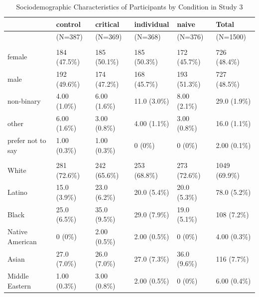 \documentclass[
]{book}
\begin{document}
\begin{table}

\caption{\label{tab:demos-table-s3}Sociodemographic Characteristics of Participants by Condition in Study 3}
\centering
\begin{tabular}[t]{llllll}
\toprule
  & control & critical & individual & naive & Total\\
\midrule
 & (N=387) & (N=369) & (N=368) & (N=376) & (N=1500)\\
\addlinespace[0.3em]
\multicolumn{6}{l}{\textbf{Gender}}\\
\hspace{1em}female & 184 (47.5\%) & 185 (50.1\%) & 185 (50.3\%) & 172 (45.7\%) & 726 (48.4\%)\\
\hspace{1em}male & 192 (49.6\%) & 174 (47.2\%) & 168 (45.7\%) & 193 (51.3\%) & 727 (48.5\%)\\
\hspace{1em}non-binary & 4.00 (1.0\%) & 6.00 (1.6\%) & 11.0 (3.0\%) & 8.00 (2.1\%) & 29.0 (1.9\%)\\
\hspace{1em}other & 6.00 (1.6\%) & 3.00 (0.8\%) & 4.00 (1.1\%) & 3.00 (0.8\%) & 16.0 (1.1\%)\\
\hspace{1em}prefer not to say & 1.00 (0.3\%) & 1.00 (0.3\%) & 0 (0\%) & 0 (0\%) & 2.00 (0.1\%)\\
\addlinespace[0.3em]
\multicolumn{6}{l}{\textbf{Racial/ethnic Identity}}\\
\hspace{1em}White & 281 (72.6\%) & 242 (65.6\%) & 253 (68.8\%) & 273 (72.6\%) & 1049 (69.9\%)\\
\hspace{1em}Latino & 15.0 (3.9\%) & 23.0 (6.2\%) & 20.0 (5.4\%) & 20.0 (5.3\%) & 78.0 (5.2\%)\\
\hspace{1em}Black & 25.0 (6.5\%) & 35.0 (9.5\%) & 29.0 (7.9\%) & 19.0 (5.1\%) & 108 (7.2\%)\\
\hspace{1em}Native American & 0 (0\%) & 2.00 (0.5\%) & 2.00 (0.5\%) & 0 (0\%) & 4.00 (0.3\%)\\
\hspace{1em}Asian & 27.0 (7.0\%) & 26.0 (7.0\%) & 27.0 (7.3\%) & 36.0 (9.6\%) & 116 (7.7\%)\\
\hspace{1em}Middle Eastern & 1.00 (0.3\%) & 3.00 (0.8\%) & 2.00 (0.5\%) & 0 (0\%) & 6.00 (0.4\%)\\

\end{tabular}
\end{table}
\end{document}
